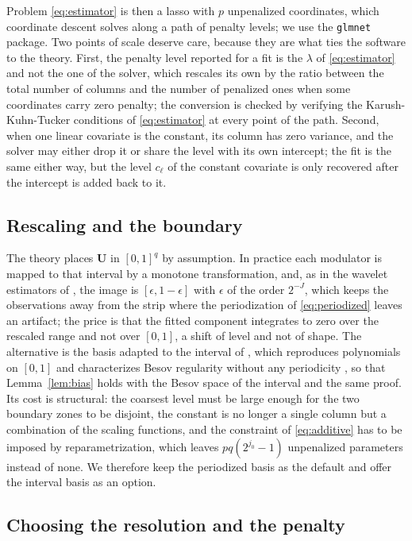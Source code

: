 \documentclass[12pt]{article} %
\theoremstyle{definition}
\newcommand{\cv}{\ell}
\newcommand{\jzero}{j_{0}}
\newcommand{\bU}{\mathbf{U}}
\newcommand{\lvl}[1]{c_{#1}}
\newcommand{\pen}{\lambda}
\begin{document}
Problem \eqref{eq:estimator} is then a lasso with $p$ unpenalized coordinates,
which coordinate descent solves along a path of penalty levels; we use the
\texttt{glmnet} package. Two points of scale deserve care, because they are
what ties the software to the theory. First, the penalty level reported for a
fit is the $\pen$ of \eqref{eq:estimator} and not the one of the solver, which
rescales its own by the ratio between the total number of columns and the
number of penalized ones when some coordinates carry zero penalty; the
conversion is checked by verifying the Karush-Kuhn-Tucker conditions of
\eqref{eq:estimator} at every point of the path. Second, when one linear
covariate is the constant, its column has zero variance, and the solver may
either drop it or share the level with its own intercept; the fit is the same
either way, but the level $\lvl{\cv}$ of the constant covariate is only
recovered after the intercept is added back to it.

\subsection{Rescaling and the boundary}
\label{sec:boundary}

The theory places $\bU$ in $[0,1]^q$ by assumption. In practice each modulator
is mapped to that interval by a monotone transformation, and, as in the
wavelet estimators of \citet*{Montoril-Chang-Vidakovic-2019}, the image is
$[\epsilon, 1-\epsilon]$ with $\epsilon$ of the order $2^{-J}$, which keeps the
observations away from the strip where the periodization of
\eqref{eq:periodized} leaves an artifact; the price is that the fitted
component integrates to zero over the rescaled range and not over $[0,1]$, a
shift of level and not of shape. The alternative is the basis adapted to the
interval of \citet*{cohen1993wavelets}, which reproduces polynomials on $[0,1]$
and characterizes Besov regularity without any periodicity
\citep[Section 3.9]{Cohen-2003}, so that Lemma~\ref{lem:bias} holds with the
Besov space of the interval and the same proof. Its cost is structural: the
coarsest level must be large enough for the two boundary zones to be disjoint,
the constant is no longer a single column but a combination of the scaling
functions, and the constraint of \eqref{eq:additive} has to be imposed by
reparametrization, which leaves $pq(2^{\jzero}-1)$ unpenalized parameters
instead of none. We therefore keep the periodized basis as the default and
offer the interval basis as an option.

\subsection{Choosing the resolution and the penalty}
\label{sec:tuning}
\end{document}
